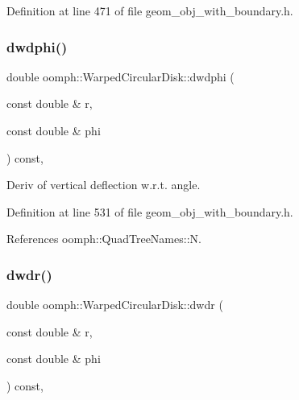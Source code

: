 Definition at line 471 of file geom\+\_\+obj\+\_\+with\+\_\+boundary.\+h.

\mbox{\label{classoomph_1_1WarpedCircularDisk_a130db675bf148aa0a19395411dd5d3ce}} 
\subsubsection{\texorpdfstring{dwdphi()}{dwdphi()}}
{\footnotesize\ttfamily double oomph\+::\+Warped\+Circular\+Disk\+::dwdphi (\begin{DoxyParamCaption}\item[{const double \&}]{r,  }\item[{const double \&}]{phi }\end{DoxyParamCaption}) const\hspace{0.3cm}{\ttfamily [inline]}, {\ttfamily [private]}}



Deriv of vertical deflection w.\+r.\+t. angle. 



Definition at line 531 of file geom\+\_\+obj\+\_\+with\+\_\+boundary.\+h.



References oomph\+::\+Quad\+Tree\+Names\+::N.

\mbox{\label{classoomph_1_1WarpedCircularDisk_aed38bcf8e10ffcc2f978037d7201d6d2}} 
\subsubsection{\texorpdfstring{dwdr()}{dwdr()}}
{\footnotesize\ttfamily double oomph\+::\+Warped\+Circular\+Disk\+::dwdr (\begin{DoxyParamCaption}\item[{const double \&}]{r,  }\item[{const double \&}]{phi }\end{DoxyParamCaption}) const\hspace{0.3cm}{\ttfamily [inline]}, {\ttfamily [private]}}



